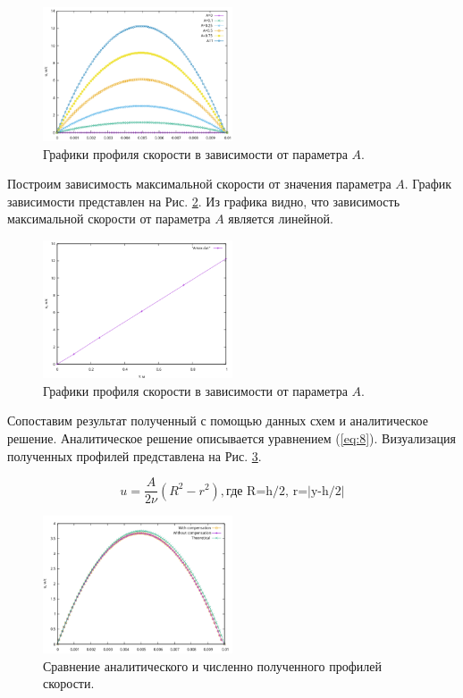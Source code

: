 \begin{figure}[H]
    \centering
    \includegraphics[width=0.5\textwidth]{images/7.png}
    \caption {Графики профиля скорости в зависимости от параметра $A$.}
    \label{fig:7}
\end{figure}

Построим зависимость максимальной скорости от значения параметра $A$. График зависимости представлен на Рис. \ref{fig:8}. Из графика видно, что зависимость максимальной скорости от параметра $A$ является линейной. 
\begin{figure}[H]
    \centering
    \includegraphics[width=0.5\textwidth]{images/8.png}
    \caption {Графики профиля скорости в зависимости от параметра $A$.}
    \label{fig:8}
\end{figure}

Сопоставим результат полученный с помощью данных схем и аналитическое решение. Аналитическое решение описывается уравнением (\ref{eq:8}).
Визуализация полученных профилей представлена на Рис. \ref{fig:9}.

\begin{equation}
    u=\frac{A}{2\nu} (R^2-r^2), \text{где R=h/2, r=|y-h/2|}
\label{eq:8}
\end{equation}


\begin{figure}[H]
    \centering
    \includegraphics[width=0.5\textwidth]{images/9.png}
    \caption {Сравнение аналитического и численно полученного профилей скорости.}
    \label{fig:9}
\end{figure}

